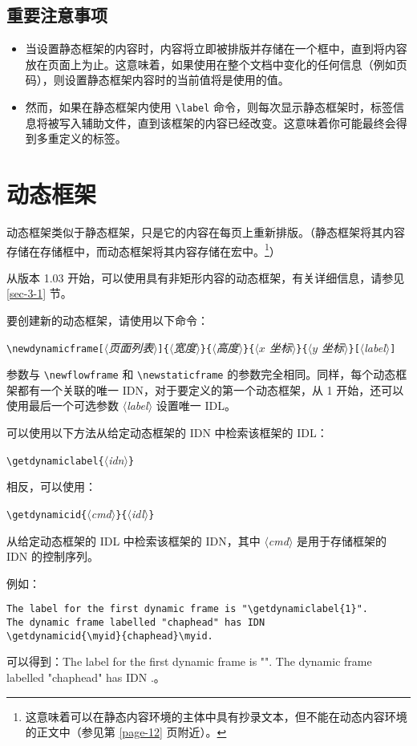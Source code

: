 \documentclass[a4paper]{book}%
\newcommand{\meta}[1]{\textnormal{\ensuremath{\langle}\makebox[0pt][l]{}\emph{#1}\makebox[0pt][l]{}\ensuremath{\rangle}}}
\begin{document}
\subsection{重要注意事项}%
\begin{itemize}
    \item 当设置静态框架的内容时，内容将立即被排版并存储在一个框中，直到将内容放在页面上为止。这意味着，如果使用在整个文档中变化的任何信息（例如页码），则设置静态框架内容时的当前值将是使用的值。
    \item 然而，如果在静态框架内使用 \verb|\label| 命令，则每次显示静态框架时，标签信息将被写入辅助文件，直到该框架的内容已经改变。这意味着你可能最终会得到多重定义的标签。
\end{itemize}
\section{动态框架}\label{sec-2-3}%
动态框架类似于静态框架，只是它的内容在每页上重新排版。（静态框架将其内容存储在存储框中，而动态框架将其内容存储在宏中。\footnote{这意味着可以在静态内容环境的主体中具有抄录文本，但不能在动态内容环境的正文中（参见第 \ref{page-12} 页附近）。}）

从版本 1.03 开始，可以使用具有非矩形内容的动态框架，有关详细信息，请参见 \ref{sec-3-1} 节。

要创建新的动态框架，请使用以下命令：
\begin{mdframed}
\verb|\newdynamicframe[|\meta{页面列表}\verb|]{|\meta{宽度}\verb|}{|\meta{高度}\verb|}{|\meta{$x$ 坐标}\verb|}{|\meta{$y$ 坐标}\verb|}[|\meta{label}\verb|]|
\end{mdframed}
参数与 \verb|\newflowframe| 和 \verb|\newstaticframe| 的参数完全相同。同样，每个动态框架都有一个关联的唯一 IDN，对于要定义的第一个动态框架，从 1 开始，还可以使用最后一个可选参数 \meta{label} 设置唯一 IDL。

可以使用以下方法从给定动态框架的 IDN 中检索该框架的 IDL：
\begin{mdframed}
\verb|\getdynamiclabel{|\meta{idn}\verb|}|
\end{mdframed}
相反，可以使用：
\begin{mdframed}
\verb|\getdynamicid{|\meta{cmd}\verb|}{|\meta{idl}\verb|}|
\end{mdframed}
从给定动态框架的 IDL 中检索该框架的 IDN，其中 \meta{cmd} 是用于存储框架的 IDN 的控制序列。

例如：
\begin{lstlisting}[backgroundcolor=\color{white}]
The label for the first dynamic frame is "\getdynamiclabel{1}".
The dynamic frame labelled "chaphead" has IDN
\getdynamicid{\myid}{chaphead}\myid.
\end{lstlisting}
可以得到：The label for the first dynamic frame is "". The dynamic frame labelled "chaphead" has IDN \myid.。
\end{document}
